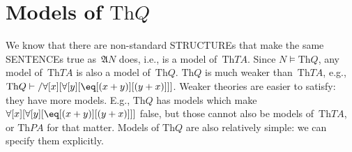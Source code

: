 \documentclass[10pt,a4paper]{article}
\newcommand*{\olup}[1]{\MakeUppercase{#1}}
\theoremstyle{plain}
\theoremstyle{definition}
\theoremstyle{remark}
\newenvironment{explain}{}{}
\newcommand*{\olfileid}[3]{}
\providecommand{\lforall}{\mathord{\forall}}
\providecommand{\Proves}{\mathrel{\vdash}}
\providecommand{\Struct}{\ensuremath{\mathfrak{A}}}
\providecommand{\Sat}[2]{\ensuremath{#1 \models #2}}
\providecommand{\Th}{\ensuremath{\mathrm{Th}}}
\begin{document}



\olfileid{mod}{mar}{mdq}
\section{Models of $\Th{Q}$}

\begin{explain}
We know that there are non-standard \olup{structure}s that make the same
\olup{sentence}s true as~$\Struct{N}$ does, i.e., is a model
of~$\Th{TA}$. Since $\Sat{N}{\Th{Q}}$, any model of~$\Th{TA}$ is also
a model of~$\Th{Q}$. $\Th{Q}$ is much weaker than~$\Th{TA}$, e.g.,
$\Th{Q} \Proves/ \lforall[x][\lforall[y][\eq[(x +
      y)][(y+x)]]]$. Weaker theories are easier to satisfy: they have
more models. E.g., $\Th{Q}$ has models which make
$\lforall[x][\lforall[y][\eq[(x + y)][(y+x)]]]$ false, but those
cannot also be models of~$\Th{TA}$, or $\Th{PA}$ for that matter.
Models of $\Th{Q}$ are also relatively simple: we can specify them
explicitly.
\end{explain}
\end{document}
